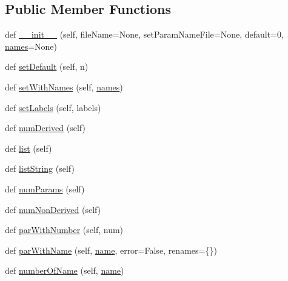 \subsection*{Public Member Functions}
\begin{DoxyCompactItemize}
\item 
def \mbox{\hyperlink{classgetdist_1_1paramnames_1_1ParamList_a2c1b6ecbcd158c986ed292dd08d9d1fb}{\+\_\+\+\_\+init\+\_\+\+\_\+}} (self, file\+Name=None, set\+Param\+Name\+File=None, default=0, \mbox{\hyperlink{classgetdist_1_1paramnames_1_1ParamList_a9213bdfb6fb036e21d6adb49a91c2b66}{names}}=None)
\item 
def \mbox{\hyperlink{classgetdist_1_1paramnames_1_1ParamList_a9e838f7022c526ae15e77fb35a2a71c3}{set\+Default}} (self, n)
\item 
def \mbox{\hyperlink{classgetdist_1_1paramnames_1_1ParamList_acb0a00bef91d544a51535273654fc815}{set\+With\+Names}} (self, \mbox{\hyperlink{classgetdist_1_1paramnames_1_1ParamList_a9213bdfb6fb036e21d6adb49a91c2b66}{names}})
\item 
def \mbox{\hyperlink{classgetdist_1_1paramnames_1_1ParamList_aef3ccf11181d8cf32448e8b70112bebe}{set\+Labels}} (self, labels)
\item 
def \mbox{\hyperlink{classgetdist_1_1paramnames_1_1ParamList_ad7152452d0cc010b858c735f69898ee3}{num\+Derived}} (self)
\item 
def \mbox{\hyperlink{classgetdist_1_1paramnames_1_1ParamList_ab27dfd8987f2ed7d1de27750b6eef094}{list}} (self)
\item 
def \mbox{\hyperlink{classgetdist_1_1paramnames_1_1ParamList_a591bf32d142f7b4f26594d509ad639a4}{list\+String}} (self)
\item 
def \mbox{\hyperlink{classgetdist_1_1paramnames_1_1ParamList_a03103e421f137da28ca687ee41e8adb9}{num\+Params}} (self)
\item 
def \mbox{\hyperlink{classgetdist_1_1paramnames_1_1ParamList_aa72f239a49fd8c4070223c225ffc9e92}{num\+Non\+Derived}} (self)
\item 
def \mbox{\hyperlink{classgetdist_1_1paramnames_1_1ParamList_ade3843133bf3fbe5fbbbf074e1a62890}{par\+With\+Number}} (self, num)
\item 
def \mbox{\hyperlink{classgetdist_1_1paramnames_1_1ParamList_a700a5bd1076df5b7a3fd00a102325175}{par\+With\+Name}} (self, \mbox{\hyperlink{classgetdist_1_1paramnames_1_1ParamList_aea1705e69ca01b937e118b44e468510a}{name}}, error=False, renames=\{\})
\item 
def \mbox{\hyperlink{classgetdist_1_1paramnames_1_1ParamList_acb31f83755b997b16c6abd4b6695ede5}{number\+Of\+Name}} (self, \mbox{\hyperlink{classgetdist_1_1paramnames_1_1ParamList_aea1705e69ca01b937e118b44e468510a}{name}})

\end{DoxyCompactItemize}
